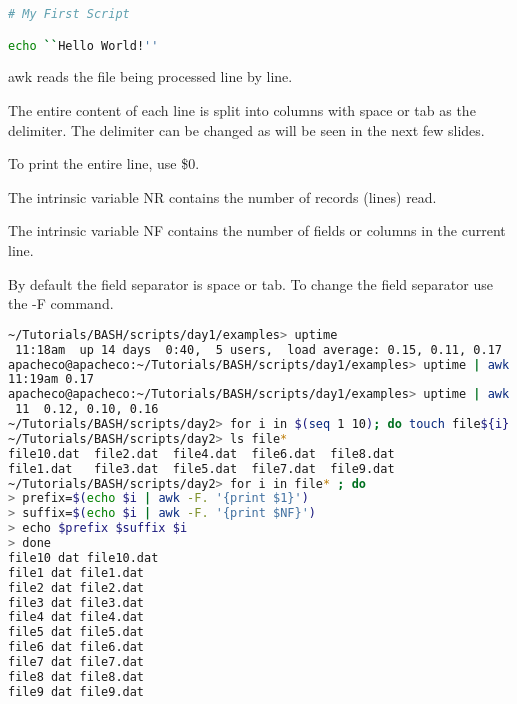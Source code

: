 \documentclass[slidestop,mathserif,compress,xcolor=svgnames]{beamer}
\begin{document}
\begin{frame}
\begin{itemize}
{\begin{lstlisting}[language=bash]
# My First Script

echo ``Hello World!''
    \end{lstlisting}
    \item awk reads the file being processed line by line. 
    \item The entire content of each line is split into columns with space or tab as the delimiter. The delimiter can be changed as will be seen in the next few slides.
    \item To print the entire line, use \$0.
    \item The intrinsic variable NR contains the number of records (lines) read.
    \item The intrinsic variable NF contains the number of fields or columns in the current line.
    \item By default the field separator is space or tab. To change the field separator use the -F command.
    \begin{lstlisting}[language=bash]
~/Tutorials/BASH/scripts/day1/examples> uptime
 11:18am  up 14 days  0:40,  5 users,  load average: 0.15, 0.11, 0.17
apacheco@apacheco:~/Tutorials/BASH/scripts/day1/examples> uptime | awk '{print $1,$NF}'
11:19am 0.17
apacheco@apacheco:~/Tutorials/BASH/scripts/day1/examples> uptime | awk -F: '{print $1,$NF}'
 11  0.12, 0.10, 0.16
~/Tutorials/BASH/scripts/day2> for i in $(seq 1 10); do touch file${i}.dat ; done
~/Tutorials/BASH/scripts/day2> ls file*
file10.dat  file2.dat  file4.dat  file6.dat  file8.dat
file1.dat   file3.dat  file5.dat  file7.dat  file9.dat
~/Tutorials/BASH/scripts/day2> for i in file* ; do
> prefix=$(echo $i | awk -F. '{print $1}')
> suffix=$(echo $i | awk -F. '{print $NF}')
> echo $prefix $suffix $i
> done
file10 dat file10.dat
file1 dat file1.dat
file2 dat file2.dat
file3 dat file3.dat
file4 dat file4.dat
file5 dat file5.dat
file6 dat file6.dat
file7 dat file7.dat
file8 dat file8.dat
file9 dat file9.dat
    \end{lstlisting}

}
\end{itemize}
\end{frame}
\end{document}
